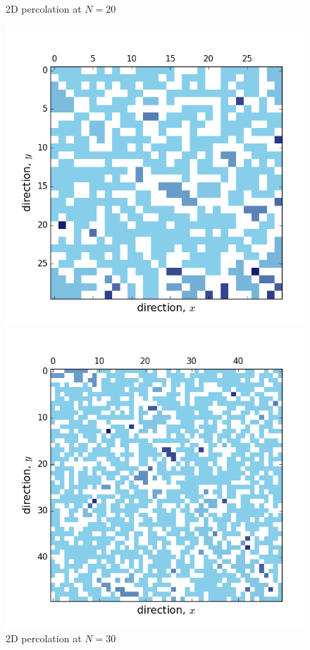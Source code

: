 \documentclass[12pt]{article}
\begin{document}
\begin{figure}[!htb]
  \caption{2D percolation at $N=20$}\label{fig:N4}
\endminipage\hfill
{}
\includegraphics[width=\linewidth]{percolation30.png}
\caption{2D percolation at $N=30$}\label{fig:N5}
\endminipage\hfill
{}
\includegraphics[width=\linewidth]{percolation50.png}

\end{figure}
\end{document}
